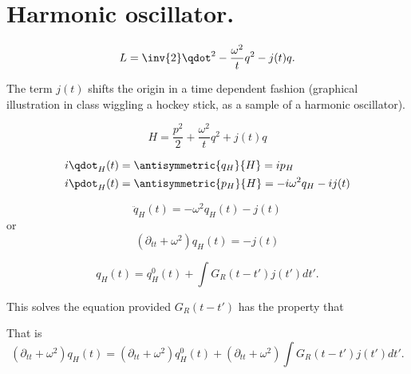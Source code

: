 %
%
\section{Harmonic oscillator.}

\begin{dmath}\label{eqn:qftLecture11:320}
L = \inv{2} \qdot^2 - \frac{\omega^2}{t} q^2 - j(t) q.
\end{dmath}

The term \( j(t) \) shifts the origin in a time dependent fashion (graphical illustration in class wiggling a hockey stick, as a sample of a harmonic oscillator).

\begin{dmath}\label{eqn:qftLecture11:340}
H = \frac{p^2}{2} + \frac{\omega^2}{t} q^2 + j(t) q
\end{dmath}

\begin{dmath}\label{eqn:qftLecture11:360}
\begin{aligned}
i \qdot_H(t) &= \antisymmetric{q_H}{H} = i p_H \\
i \pdot_H(t) &= \antisymmetric{p_H}{H} = -i \omega^2 q_H - i j(t)
\end{aligned}
\end{dmath}

\begin{dmath}\label{eqn:qftLecture11:380}
\ddot{q}_H(t) = - \omega^2 q_H(t) - j(t)
\end{dmath}
or
\begin{dmath}\label{eqn:qftLecture11:400}
(\partial_{tt} + \omega^2 ) q_H(t) = - j(t)
\end{dmath}

\begin{dmath}\label{eqn:qftLecture11:420}
q_H(t) = q_H^0( t ) +
\int G_R(t - t') j(t') dt'.
\end{dmath}

This solves the equation provided \( G_R(t - t') \) has the property that

That is
\begin{dmath}\label{eqn:qftLecture11:460}
(\partial_{tt} + \omega^2)
q_H(t) =
(\partial_{tt} + \omega^2)
q_H^0( t )
+
(\partial_{tt} + \omega^2)
\int G_R(t - t') j(t') dt'.
\end{dmath}

